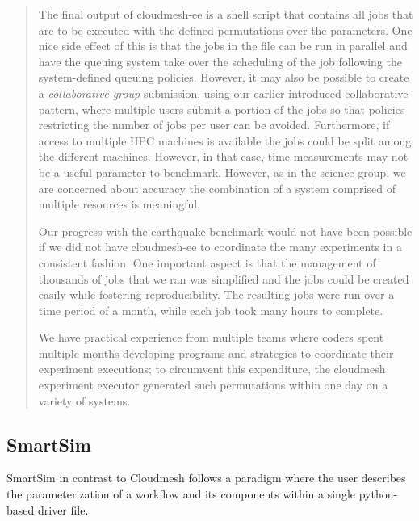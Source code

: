 \documentclass[utf8]{FrontiersinVancouver} %
\begin{document}
\begin{quote}
The final output of cloudmesh-ee is a shell script that contains all jobs that are to be executed with the defined permutations over the parameters. One nice side effect of this is that the jobs in the file can be run in parallel and have the queuing system take over the scheduling of the job following the system-defined queuing policies. However, it may also be possible to create a {\it collaborative group} submission, using our earlier introduced collaborative pattern, where multiple users submit a portion of the jobs so that policies restricting the number of jobs per user can be avoided. Furthermore, if access to multiple HPC machines is available the jobs could be split among the different machines. However, in that case, time measurements may not be a useful parameter to benchmark. However, as in the science group, we are concerned about accuracy the combination of a system comprised of multiple resources is meaningful.

Our progress with the earthquake benchmark would not have been possible if we did not have cloudmesh-ee to coordinate the many experiments in a consistent fashion. One important aspect is that the management of thousands of jobs that we ran was simplified and the jobs could be created easily while fostering reproducibility. The resulting jobs were run over a time period of a month, while each job took many hours to complete.

We have practical experience from multiple teams where coders spent multiple months developing programs and strategies to coordinate their experiment executions; to circumvent this expenditure, the cloudmesh experiment executor generated such permutations within one day on a variety of systems.

\end{quote}

\subsection{SmartSim}

SmartSim in contrast to Cloudmesh follows a paradigm where the user describes the parameterization of a workflow and its components within a single python-based driver file.
\end{document}
